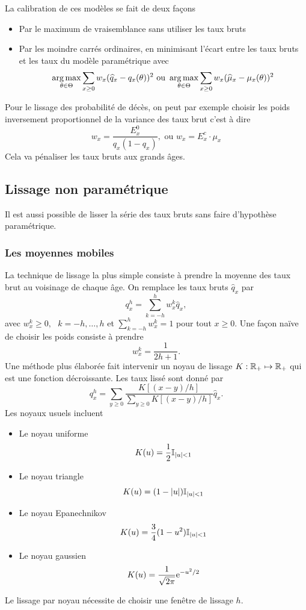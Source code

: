 La calibration de ces modèles se fait de deux façons
\begin{itemize}
  \item Par le maximum de vraisemblance sans utiliser les taux bruts
  \item Par les moindre carrés ordinaires, en minimisant l'écart entre les taux bruts et les taux du modèle paramétrique avec 
  $$
\operatorname*{arg\,max}_{\theta\in\Theta}\sum_{x\geq 0}w_x(\widehat{q}_x - q_x(\theta))^2\text{ ou } \operatorname*{arg\,max}_{\theta\in\Theta}\sum_{x\geq 0}w_x(\widehat{\mu}_x - \mu_x(\theta))^2
  $$
\end{itemize}
\begin{remark}
Pour le lissage des probabilité de décès, on peut par exemple choisir les poids inversement proportionnel de la variance des taux brut c'est à dire 
$$
w_x = \frac{E^0_x}{q_x(1-q_x)},\text{ ou }w_x = E_x^c \cdot\mu_x
$$
Cela va pénaliser les taux bruts aux grands âges.
\end{remark}
\subsection{Lissage non paramétrique}
Il est aussi possible de lisser la série des taux bruts sans faire d'hypothèse paramétrique. 
\subsubsection{Les moyennes mobiles}
La technique de lissage la plus simple consiste à prendre la moyenne des taux brut au voisinage de chaque âge. On remplace les taux bruts $\widehat{q}_x$ par 
$$
q^h_x = \sum_{k = -h}^h w_{x}^k \widehat{q}_x ,
$$
avec $w_x^k\geq 0,\text{ }k=-h,\ldots, h$ et $\sum_{k=-h}^{h} w_x^k = 1$ pour tout $x\geq 0$. Une façon naïve de choisir les poids consiste à prendre 
$$
w_x^k = \frac{1}{2h+1}.
$$
Une méthode plus élaborée fait intervenir un noyau de lissage $K:\mathbb{R}_+\mapsto \mathbb{R}_+$ qui est une fonction décroissante. Les taux lissé sont donné par 
$$
q^h_x = \sum_{y\geq0} \frac{K[(x-y)/h]}{\sum_{y\geq 0}K[(x-y)/h]}\widehat{q}_x.
$$
Les noyaux usuels incluent
\begin{itemize}
  \item Le noyau uniforme
  $$
K(u) = \frac{1}{2}\mathbb{I}_{|u|<1}
  $$
  \item Le noyau triangle 
  $$
  K(u) = (1-|u|)\mathbb{I}_{|u|<1}
  $$
  \item Le noyau Epanechnikov 
  $$
  K(u) = \frac{3}{4}(1-u^2)\mathbb{I}_{|u|<1}
  $$
  \item Le noyau gaussien 
  $$
  K(u) = \frac{1}{\sqrt{2\pi}}\mathrm{e}^{-u^2/2}
  $$
\end{itemize}
Le lissage par noyau nécessite de choisir une fenêtre de lissage $h$.
